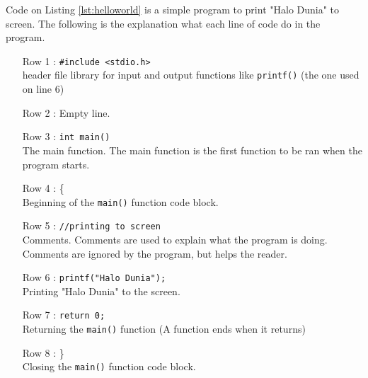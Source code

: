Code on Listing \ref{lst:helloworld} is a simple program to print "Halo Dunia" to screen. The following is the explanation what each line of code do in the program.
\begin{itemize}\setlength\itemsep{-0.1em}
	\item [Row 1 :] \verb|#include <stdio.h>|\\ header file library for input and output functions like \verb|printf()| (the one used on line 6)
	\item[Row 2 :] Empty line. 
	\item [Row 3 :] \verb|int main()|\\ The main function. The main function is the first function to be ran when the program starts.
	\item[Row 4 :] \{ \\Beginning of the \verb|main()| function code block.
	\item[Row 5 :]\verb|//printing to screen|\\ Comments. Comments are used to explain what the program is doing. Comments are ignored by the program, but helps the reader.
	\item[Row 6 :]\verb|printf("Halo Dunia");|\\ Printing "Halo Dunia" to the screen.
	\item[Row 7 :] \verb|return 0;| \\Returning the \verb|main()| function (A function ends when it returns)
	\item [Row 8 :] \}\\Closing the \verb|main()| function code block.


\end{itemize}
